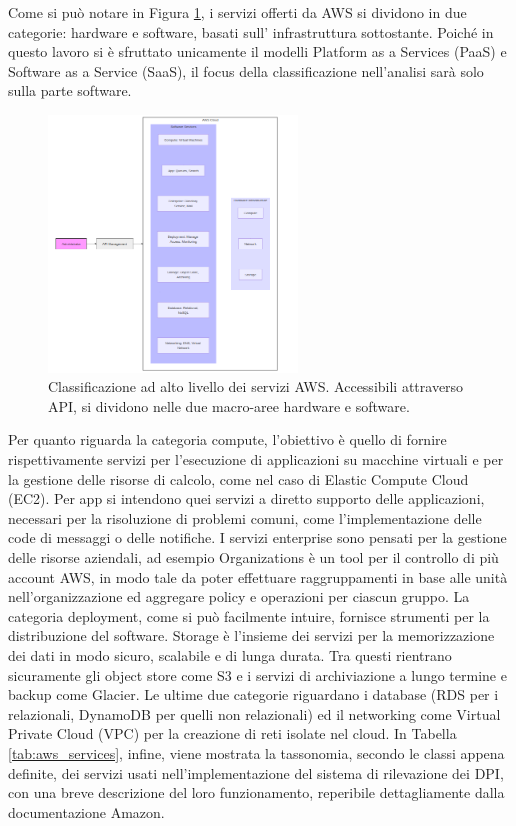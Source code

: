 Come si può notare in Figura \ref{fig:services_taxonomy}, i servizi offerti da AWS si dividono in due categorie: hardware e software, basati sull' infrastruttura sottostante\cite{a12AWSinAction}. Poiché in questo lavoro si è sfruttato unicamente il modelli Platform as a Services (PaaS) e Software as a Service (SaaS), 
il focus della classificazione nell'analisi sarà solo sulla parte software.
\begin{figure}[htbp]
    \centering
    \includegraphics[width=0.59\textwidth]{figures/aws_services_taxonomy.png}
    \caption{Classificazione ad alto livello dei servizi AWS. Accessibili attraverso API, si dividono nelle due macro-aree hardware e software.}
    \label{fig:services_taxonomy}
\end{figure}

Per quanto riguarda la categoria compute, l'obiettivo è quello di fornire rispettivamente servizi per l'esecuzione di applicazioni su macchine virtuali e per la gestione delle risorse di calcolo, come nel caso di Elastic Compute Cloud (EC2). Per app si intendono quei servizi a diretto supporto delle applicazioni, necessari per la risoluzione di problemi comuni, come l'implementazione delle code di messaggi o delle notifiche. I servizi enterprise sono pensati per la gestione delle risorse aziendali, ad esempio Organizations è un tool per il controllo di più account AWS, in modo tale da poter effettuare raggruppamenti in base alle unità nell'organizzazione ed aggregare policy e operazioni per ciascun gruppo. La categoria deployment, come si può facilmente intuire, fornisce strumenti per la distribuzione del software. Storage è l'insieme dei servizi per la memorizzazione dei dati in modo sicuro, scalabile e di lunga durata. Tra questi rientrano sicuramente gli object store come S3 e i servizi di archiviazione a lungo termine e backup come Glacier. Le ultime due categorie riguardano i database (RDS per i relazionali, DynamoDB per quelli non relazionali) ed il networking come Virtual Private Cloud (VPC) per la creazione di reti isolate nel cloud. %
In Tabella \ref{tab:aws_services}, infine, viene mostrata la tassonomia, secondo le classi appena definite, dei servizi usati nell'implementazione del sistema di rilevazione dei DPI, con una breve descrizione del loro funzionamento, reperibile dettagliamente dalla documentazione Amazon\cite{a13AWSDoc}. 

